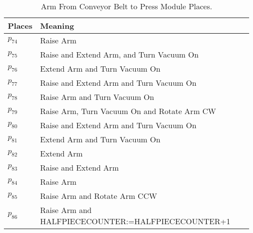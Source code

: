 \begin{table}[H]
\caption{Arm From Conveyor Belt to Press Module Places.}
\centering
\begin{tabular}{M{5cm}M{10cm}}
Places & Meaning\\
\hline
\hyperlink{partialNet:p74}{\hypertarget{partialTable:p74}{$p_{74}$}} & Raise Arm\\
\hyperlink{partialNet:p75}{\hypertarget{partialTable:p75}{$p_{75}$}} & Raise and Extend Arm, and Turn Vacuum On\\
\hyperlink{partialNet:p76}{\hypertarget{partialTable:p76}{$p_{76}$}} & Extend Arm and Turn Vacuum On\\
\hyperlink{partialNet:p77}{\hypertarget{partialTable:p77}{$p_{77}$}} & Raise and Extend Arm and Turn Vacuum On\\
\hyperlink{partialNet:p78}{\hypertarget{partialTable:p78}{$p_{78}$}} & Raise Arm and Turn Vacuum On\\
\hyperlink{partialNet:p79}{\hypertarget{partialTable:p79}{$p_{79}$}} & Raise Arm, Turn Vacuum On and  Rotate Arm CW\\
\hyperlink{partialNet:p80}{\hypertarget{partialTable:p80}{$p_{80}$}} & Raise and Extend Arm and Turn Vacuum On\\
\hyperlink{partialNet:p81}{\hypertarget{partialTable:p81}{$p_{81}$}} & Extend Arm and  Turn Vacuum On\\
\hyperlink{partialNet:p82}{\hypertarget{partialTable:p82}{$p_{82}$}} & Extend Arm\\
\hyperlink{partialNet:p83}{\hypertarget{partialTable:p83}{$p_{83}$}} & Raise and Extend Arm\\
\hyperlink{partialNet:p84}{\hypertarget{partialTable:p84}{$p_{84}$}} & Raise Arm\\
\hyperlink{partialNet:p85}{\hypertarget{partialTable:p85}{$p_{85}$}} & Raise Arm and Rotate Arm CCW\\
\hyperlink{partialNet:p86}{\hypertarget{partialTable:p86}{$p_{86}$}} & Raise Arm and HALFPIECECOUNTER:=HALFPIECECOUNTER+1\\
\end{tabular}
\end{table}
